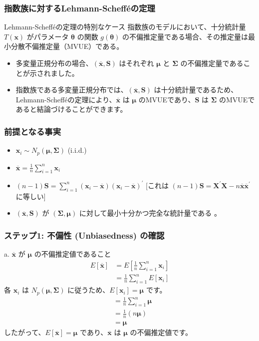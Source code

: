 \documentclass[aspectratio=169]{beamer}
\begin{document}
\begin{frame}
\frametitle{指数族に対するLehmann-Schefféの定理}
\begin{block}{Lehmann-Schefféの定理の特別なケース}
指数族のモデルにおいて、十分統計量 $T(\bm{x})$ がパラメータ $\bm{\theta}$ の関数 $g(\bm{\theta})$ の不偏推定量である場合、その推定量は最小分散不偏推定量（MVUE）である。
\end{block}
\begin{itemize}
    \item 多変量正規分布の場合、$(\overline{\bm{x}},\bm{S})$ はそれぞれ $\bm{\mu}$ と $\bm{\Sigma}$ の不偏推定量であることが示されました。
    \item 指数族である多変量正規分布では、$(\overline{\bm{x}},\bm{S})$ は十分統計量であるため、Lehmann-Schefféの定理により、$\overline{\bm{x}}$ は $\bm{\mu}$ のMVUEであり、$\bm{S}$ は $\bm{\Sigma}$ のMVUEであると結論づけることができます。
\end{itemize}
\end{frame}

\begin{frame}
\frametitle{前提となる事実}
\begin{itemize}
    \item $\bm{x}_i \sim N_p(\bm{\mu},\bm{\Sigma})$ (i.i.d.) 
    \item $\overline{\bm{x}} = \frac{1}{n}\sum_{i=1}^{n}\bm{x}_i$ 
    \item $(n-1)\bm{S}=\sum_{i=1}^{n}(\bm{x}_i-\overline{\bm{x}})(\bm{x}_i-\overline{\bm{x}})^{\prime}$ [これは $(n-1)\bm{S}=\bm{X}^{\prime}\bm{X}-n\overline{\bm{x}}\overline{\bm{x}}^{\prime}$ に等しい]
    \item $(\overline{\bm{x}},\bm{S})$ が $(\bm{\Sigma},\bm{\mu})$ に対して最小十分かつ完全な統計量である  。
\end{itemize}
\end{frame}

\begin{frame}
\frametitle{ステップ1: 不偏性 (Unbiasedness) の確認}
\begin{block}{a. $\overline{\bm{x}}$ が $\bm{\mu}$ の不偏推定値であること}
\begin{align*}
E[\overline{\bm{x}}] &= E\left[\frac{1}{n}\sum_{i=1}^{n}\bm{x}_i\right] \\
&= \frac{1}{n}\sum_{i=1}^{n}E[\bm{x}_i]
\end{align*}
各 $\bm{x}_i$ は $N_p(\bm{\mu},\bm{\Sigma})$ に従うため、$E[\bm{x}_i]=\bm{\mu}$ です。
\begin{align*}
&= \frac{1}{n}\sum_{i=1}^{n}\bm{\mu} \\
&= \frac{1}{n}(n\bm{\mu}) \\
&= \bm{\mu}
\end{align*}
したがって、$E[\overline{\bm{x}}]=\bm{\mu}$ であり、$\overline{\bm{x}}$ は $\bm{\mu}$ の不偏推定値です。
\end{block}
\end{frame}
\end{document}
